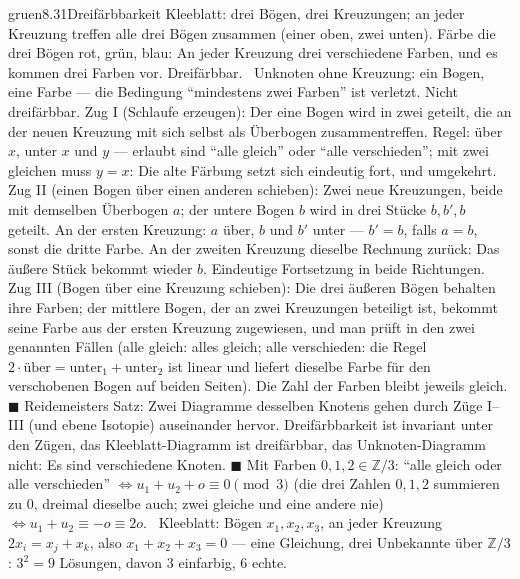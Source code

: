 \begin{loesungkarte}{gruen}{8.31}{Dreifärbbarkeit}
Kleeblatt: drei Bögen, drei Kreuzungen; an jeder Kreuzung treffen alle drei Bögen zusammen (einer oben, zwei unten). Färbe die drei Bögen rot, grün, blau: An jeder Kreuzung drei verschiedene Farben, und es kommen drei Farben vor. Dreifärbbar. \checkmark\ Unknoten ohne Kreuzung: ein Bogen, eine Farbe --- die Bedingung \enquote{mindestens zwei Farben} ist verletzt. Nicht dreifärbbar.
Zug I (Schlaufe erzeugen): Der eine Bogen wird in zwei geteilt, die an der neuen Kreuzung mit sich selbst als Überbogen zusammentreffen. Regel: über $x$, unter $x$ und $y$ --- erlaubt sind \enquote{alle gleich} oder \enquote{alle verschieden}; mit zwei gleichen muss $y = x$: Die alte Färbung setzt sich eindeutig fort, und umgekehrt. Zug II (einen Bogen über einen anderen schieben): Zwei neue Kreuzungen, beide mit demselben Überbogen $a$; der untere Bogen $b$ wird in drei Stücke $b, b', b$ geteilt. An der ersten Kreuzung: $a$ über, $b$ und $b'$ unter --- $b' = b$, falls $a = b$, sonst die dritte Farbe. An der zweiten Kreuzung dieselbe Rechnung zurück: Das äußere Stück bekommt wieder $b$. Eindeutige Fortsetzung in beide Richtungen. Zug III (Bogen über eine Kreuzung schieben): Die drei äußeren Bögen behalten ihre Farben; der mittlere Bogen, der an zwei Kreuzungen beteiligt ist, bekommt seine Farbe aus der ersten Kreuzung zugewiesen, und man prüft in den zwei genannten Fällen (alle gleich: alles gleich; alle verschieden: die Regel $2\cdot\text{über} = \text{unter}_1 + \text{unter}_2$ ist linear und liefert dieselbe Farbe für den verschobenen Bogen auf beiden Seiten). Die Zahl der Farben bleibt jeweils gleich. $\blacksquare$
Reidemeisters Satz: Zwei Diagramme desselben Knotens gehen durch Züge I--III (und ebene Isotopie) auseinander hervor. Dreifärbbarkeit ist invariant unter den Zügen, das Kleeblatt-Diagramm ist dreifärbbar, das Unknoten-Diagramm nicht: Es sind verschiedene Knoten. $\blacksquare$
Mit Farben $0, 1, 2\in\mathbb Z/3$: \enquote{alle gleich oder alle verschieden} $\iff u_1 + u_2 + o\equiv0\pmod3$ (die drei Zahlen $0, 1, 2$ summieren zu $0$, dreimal dieselbe auch; zwei gleiche und eine andere nie) $\iff u_1 + u_2\equiv-o\equiv2o$. \checkmark\ Kleeblatt: Bögen $x_1, x_2, x_3$, an jeder Kreuzung $2x_i = x_j + x_k$, also $x_1 + x_2 + x_3 = 0$ --- eine Gleichung, drei Unbekannte über $\mathbb Z/3$: $3^{2} = 9$ Lösungen, davon $3$ einfarbig, $6$ echte.

\end{loesungkarte}
